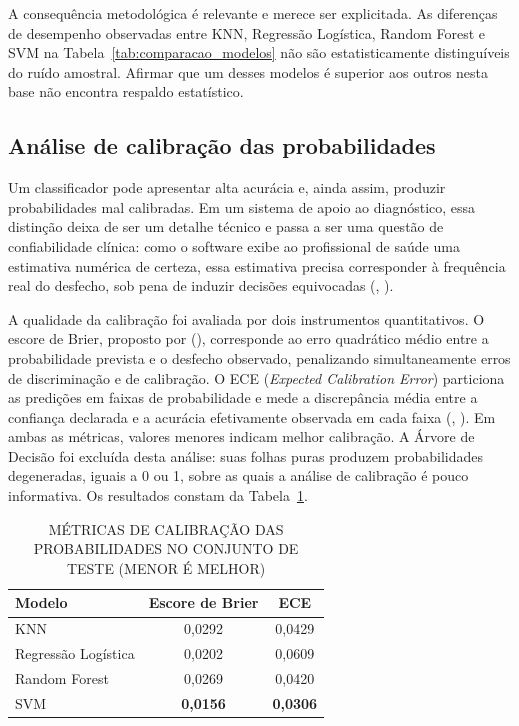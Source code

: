 \documentclass[
    12pt
    ,oneside
    ,a4paper
    ,chapter=TITLE
    ,section=TITLE
    ,sumario=abnt-6027-2012
    ,english,brazil]{abntex2} %
\begin{document}
A consequência metodológica é relevante e merece ser explicitada. As diferenças
de desempenho observadas entre KNN, Regressão Logística, Random Forest e SVM na
Tabela~\ref{tab:comparacao_modelos} não são estatisticamente distinguíveis do
ruído amostral. Afirmar que um desses modelos é superior aos outros nesta base
não encontra respaldo estatístico.

\subsection{Análise de calibração das probabilidades}
\label{subsec:calibracao}

Um classificador pode apresentar alta acurácia e, ainda assim, produzir
probabilidades mal calibradas. Em um sistema de apoio ao diagnóstico,
essa distinção deixa de ser um detalhe técnico e passa a ser uma questão de
confiabilidade clínica: como o software exibe ao profissional de saúde uma
estimativa numérica de certeza, essa estimativa precisa corresponder à
frequência real do desfecho, sob pena de induzir decisões equivocadas
(, \citeyear{Guo2017}).

A qualidade da calibração foi avaliada por dois instrumentos quantitativos. O
escore de Brier, proposto por 
(\citeyear{Brier1950}), corresponde ao erro quadrático médio entre a
probabilidade prevista e o desfecho observado, penalizando simultaneamente
erros de discriminação e de calibração. O ECE (\textit{Expected Calibration
Error}) particiona as predições em faixas de probabilidade e mede a discrepância
média entre a confiança declarada e a acurácia efetivamente observada em cada
faixa (, \citeyear{Guo2017}). Em ambas as métricas,
valores menores indicam melhor calibração. A Árvore de Decisão foi excluída
desta análise: suas folhas puras produzem probabilidades degeneradas, iguais a
0 ou 1, sobre as quais a análise de calibração é pouco informativa. Os resultados
constam da Tabela~\ref{tab:calibracao}.

\begin{table}[htbp]
    \centering
    \caption{MÉTRICAS DE CALIBRAÇÃO DAS PROBABILIDADES NO CONJUNTO DE TESTE (MENOR É MELHOR)}
    \label{tab:calibracao}
    \begin{tabular}{@{}lcc@{}}
        \toprule
        \textbf{Modelo} & \textbf{Escore de Brier} & \textbf{ECE} \\
        \midrule
        KNN                 & 0,0292 & 0,0429 \\
        Regressão Logística & 0,0202 & 0,0609 \\
        Random Forest       & 0,0269 & 0,0420 \\
        SVM                 & \textbf{0,0156} & \textbf{0,0306} \\
        \bottomrule
    \end{tabular}
    \vspace{0.2cm}
    \fonteautor
\end{table}
\end{document}
